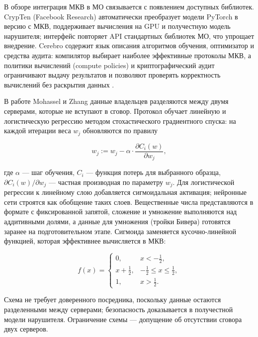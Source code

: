 В обзоре \cite{07} интеграция МКВ в МО связывается с появлением доступных библиотек. CrypTen (Facebook Research) \cite{22} автоматически преобразует модели PyTorch в версию с МКВ, поддерживает вычисления на GPU и получестную модель нарушителя; интерфейс повторяет API стандартных библиотек МО, что упрощает внедрение. Cerebro содержит язык описания алгоритмов обучения, оптимизатор и средства аудита: компилятор выбирает наиболее эффективные протоколы МКВ, а политики вычислений (compute policies) и криптографический аудит ограничивают выдачу результатов и позволяют проверять корректность вычислений без раскрытия данных \cite{07}.

В работе Mohassel и Zhang \cite{23} данные владельцев разделяются между двумя серверами, которые не вступают в сговор. Протокол обучает линейную и логистическую регрессию методом стохастического градиентного спуска: на каждой итерации веса \(w_j\) обновляются по правилу

\begin{equation}
w_j := w_j - \alpha \cdot \frac{\partial C_i(w)}{\partial w_j},
\end{equation}

где \(\alpha\) --- шаг обучения, \(C_i\) --- функция потерь для выбранного образца, \(\partial C_i(w) / \partial w_j\) --- частная производная по параметру \(w_j\). Для логистической регрессии к линейному слою добавляется сигмоидальная активация; нейронные сети строятся как обобщение таких слоев. Вещественные числа представляются в формате с фиксированной запятой, сложение и умножение выполняются над аддитивными долями, а данные для умножения (тройки Бивера) готовятся заранее на подготовительном этапе. Сигмоида заменяется кусочно-линейной функцией, которая эффективнее вычисляется в МКВ:

\begin{equation}
f(x) =
\begin{cases}
0, & x < -\tfrac{1}{2},\\
x + \tfrac{1}{2}, & -\tfrac{1}{2} \le x \le \tfrac{1}{2},\\
1, & x > \tfrac{1}{2}.
\end{cases}
\end{equation}

Схема не требует доверенного посредника, поскольку данные остаются разделенными между серверами; безопасность доказывается в получестной модели нарушителя. Ограничение схемы --- допущение об отсутствии сговора двух серверов.

